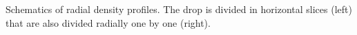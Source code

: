 \label{fig:Slices}Schematics of radial density profiles. The drop
is divided in horizontal slices (left) that are also divided radially
one by one (right). 